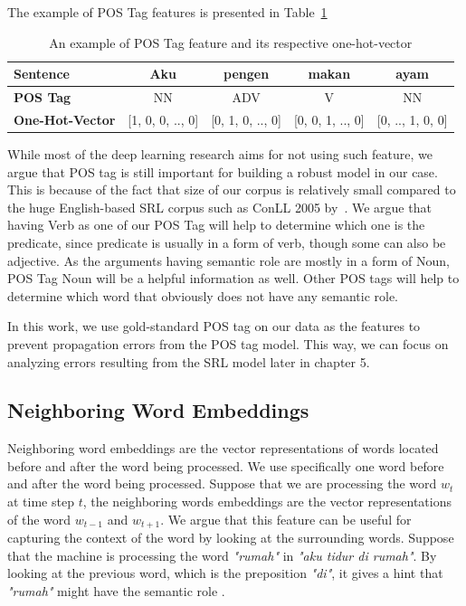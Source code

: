 The example of POS Tag features is presented in Table~\ref{tab:examplepos}
\begin{table}
	\centering
	\caption{An example of POS Tag feature and its respective one-hot-vector}
	\label{tab:examplepos}
	\begin{tabular}{|lcccc|}
		\hline
		\textbf{Sentence} 				& Aku & pengen & makan & ayam \\
		\hline
		\textbf{POS Tag}				& NN & ADV & V & NN  \\
		\hline
		\textbf{One-Hot-Vector}		& [1, 0, 0, .., 0] & [0, 1, 0, .., 0] & [0, 0, 1, .., 0] & [0, .., 1, 0, 0] \\
		\hline
	\end{tabular}
\end{table}

While most of the deep learning research aims for not using such feature, we argue that POS tag is still important for building a robust model in our case. This is because of the fact that size of our corpus is relatively small compared to the huge English-based SRL corpus such as ConLL 2005 by~\cite{carreras2005introduction}. We argue that having Verb as one of our POS Tag will help to determine which one is the predicate, since predicate is usually in a form of verb, though some can also be adjective. As the arguments having semantic role are mostly in a form of Noun, POS Tag Noun will be a helpful information as well. Other POS tags will help to determine which word that obviously does not have any semantic role.

In this work, we use gold-standard POS tag on our data as the features to prevent propagation errors from the POS tag model. This way, we can focus on analyzing errors resulting from the SRL model later in chapter 5. 

\subsection{Neighboring Word Embeddings}
Neighboring word embeddings are the vector representations of words located before and after the word being processed. We use specifically one word before and after the word being processed. Suppose that we are processing the word $w_{t}$ at time step $t$, the neighboring words embeddings are the vector representations of the word $w_{t-1}$ and $w_{t+1}$. We argue that this feature can be useful for capturing the context of the word by looking at the surrounding words. Suppose that the machine is processing the word \textit{"rumah"} in \textit{"aku tidur di rumah"}. By looking at the previous word, which is the preposition \textit{"di"}, it gives a hint that \textit{"rumah"} might have the semantic role \location.

